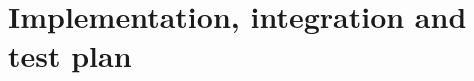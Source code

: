 \section{Implementation, integration and test plan}
\label{sect:implementationintegrationandtestplan}